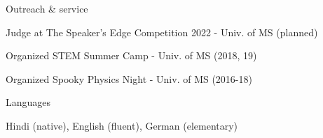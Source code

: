 \documentclass{resume} %
\begin{document}

\begin{rSection}{Outreach \& service}

Judge at The Speaker’s Edge Competition 2022 - Univ. of MS (planned)

Organized STEM Summer Camp - Univ. of MS  (2018, 19)  

Organized Spooky Physics Night - Univ. of MS (2016-18) 


 
 



\end{rSection}




\begin{rSection}{Languages}


Hindi (native), English (fluent), German (elementary)


\end{rSection}




\iffalse

\begin{rSection}{References}


\begin{multicols}{3}
\begin{itemize}
\item  Leo C. Stein      \\University of Mississippi\\ \href{lcstein@olemiss.edu}{lcstein@olemiss.edu} \\ \\
\item Emanuele Berti\\Johns Hopkins University\\ \href{berti@jhu.edu}{berti@jhu.edu}     \\ \\
\item Achamveedu Gopakumar\\TIFR Mumbai\\ \href{gopu@tifr.res.in}{gopu@tifr.res.in}    \\ 
\end{itemize}
\end{multicols}


\end{rSection}

\fi
\end{document}
